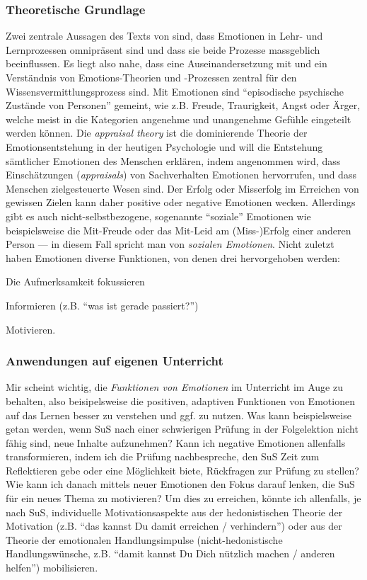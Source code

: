 \begin{myExBox}[title=Emotionen verstehen und positiv beeinflussen]
\subsubsection*{Theoretische Grundlage}
Zwei zentrale Aussagen des Texts von \textcite{alma99116838938605511} sind, dass Emotionen in Lehr- und Lernprozessen omnipräsent sind und dass sie beide Prozesse massgeblich beeinflussen. Es liegt also nahe, dass eine Auseinandersetzung mit und ein Verständnis von Emotions-Theorien und -Prozessen zentral für den Wissensvermittlungsprozess sind. Mit Emotionen sind ``episodische psychische Zustände von Personen'' gemeint, wie z.B. Freude, Traurigkeit, Angst oder Ärger, welche meist in die Kategorien angenehme und unangenehme Gefühle eingeteilt werden können. Die \textit{appraisal theory} ist die dominierende Theorie der Emotionsentstehung in der heutigen Psychologie und will die Entstehung sämtlicher Emotionen des Menschen erklären, indem angenommen wird, dass Einschätzungen (\textit{appraisals}) von Sachverhalten Emotionen hervorrufen, und dass Menschen zielgesteuerte Wesen sind. Der Erfolg oder Misserfolg im Erreichen von gewissen Zielen kann daher positive oder negative Emotionen wecken. Allerdings gibt es auch nicht-selbstbezogene, sogenannte ``soziale'' Emotionen wie beispielsweise die Mit-Freude oder das Mit-Leid am (Miss-)Erfolg einer anderen Person --- in diesem Fall spricht man von \textit{sozialen Emotionen}. Nicht zuletzt haben Emotionen diverse Funktionen, von denen drei hervorgehoben werden: \begin{enumerate*}
\item Die Aufmerksamkeit fokussieren
\item Informieren (z.B. ``was ist gerade passiert?'')
\item Motivieren.
\end{enumerate*}

\subsubsection*{Anwendungen auf eigenen Unterricht}
Mir scheint wichtig, die \textit{Funktionen von Emotionen} im Unterricht im Auge zu behalten, also beisipelsweise die positiven, adaptiven Funktionen von Emotionen auf das Lernen besser zu verstehen und ggf. zu nutzen. Was kann beispielsweise getan werden, wenn SuS nach einer schwierigen Prüfung in der Folgelektion nicht fähig sind, neue Inhalte aufzunehmen? Kann ich negative Emotionen allenfalls transformieren, indem ich die Prüfung nachbespreche, den SuS Zeit zum Reflektieren gebe oder eine Möglichkeit biete, Rückfragen zur Prüfung zu stellen? Wie kann ich danach mittels neuer Emotionen den Fokus darauf lenken, die SuS für ein neues Thema zu motivieren? Um dies zu erreichen, könnte ich allenfalls, je nach SuS, individuelle Motivationsaspekte aus der hedonistischen Theorie der Motivation (z.B. ``das kannst Du damit erreichen / verhindern'') oder aus der Theorie der emotionalen Handlungsimpulse (nicht-hedonistische Handlungswünsche, z.B. ``damit kannst Du Dich nützlich machen / anderen helfen'') mobilisieren.\end{myExBox}

